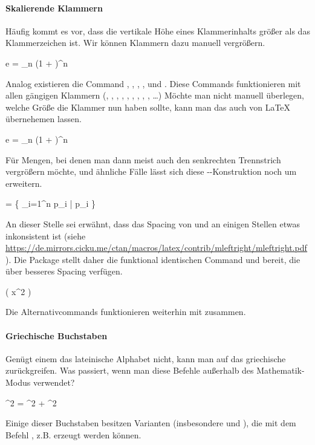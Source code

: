 \paragraph{Skalierende Klammern} Häufig kommt es vor, dass die vertikale Höhe eines Klammerinhalts größer als das Klammerzeichen ist.
Wir können Klammern dazu manuell vergrößern.
\begin{latexlisting}
	e = \lim_{n \to \infty} \bigl(1 +  \bigr)^n
\end{latexlisting}
Analog existieren die Command , , , ,  und .
Diese Commands funktionieren mit allen gängigen Klammern (\key{[}, \key{]}, \latexcommand{\{}, \latexcommand{\}}, , , \latexcommand{|}, \latexcommand{|}, \key{|}, \dots)
Möchte man nicht manuell überlegen, welche Größe die Klammer nun haben sollte, kann man das auch von \LaTeX{} übernehemen lassen.
\begin{latexlisting}
	e = \lim_{n \to \infty} \left(1 +  \right)^n
\end{latexlisting}
Für Mengen, bei denen man dann meist auch den senkrechten Trennstrich vergrößern möchte, und ähnliche Fälle lässt sich diese --Konstruktion noch um  erweitern.
\begin{latexlisting}
	 = \left\{ \prod_{i=1}^n p_i \middle| p_i \in {} \right\}
\end{latexlisting}
An dieser Stelle sei erwähnt, dass das Spacing von  und  an einigen Stellen etwas inkonsistent ist (siehe \url{https://de.mirrors.cicku.me/ctan/macros/latex/contrib/mleftright/mleftright.pdf}).
Die Package  stellt daher die funktional identischen Command  und  bereit, die über besseres Spacing verfügen.
\begin{latexlisting}
	\sin \mleft( x^2 \mright)
\end{latexlisting}
Die Alternativcommands funktionieren weiterhin mit  zusammen.

\paragraph{Griechische Buchstaben} Genügt einem das lateinische Alphabet nicht, kann man auf das griechische zurückgreifen.
Was passiert, wenn man diese Befehle außerhalb des Mathematik-Modus verwendet?
\begin{latexlisting}
	\alpha^2 = \beta^2 + \gamma^2 \qquad \omega \neq \Omega
\end{latexlisting}
Einige dieser Buchstaben besitzen Varianten (insbesondere  und ), die mit dem Befehl , z.B.  erzeugt werden können.

